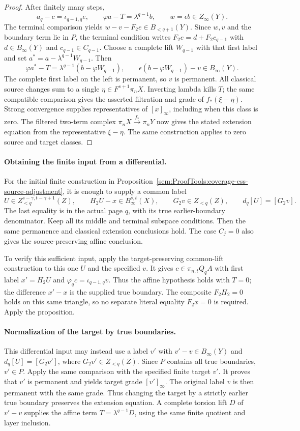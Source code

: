 \begin{proof}
After finitely many steps,
\[
 a_q-c=\iota_{q-1,q}e,\qquad
 \varphi a-T=\lambda^{q-1}b,
 \qquad w=\epsilon b\in Z_\infty(Y).
\]
The terminal comparison yields
$w-v-F_2e\in B_{<q+1}(Y)$. Since $w,v$ and the boundary term lie in $P$,
the terminal condition writes $F_2e=d+F_2c_{q-1}$ with
$d\in B_\infty(Y)$ and $c_{q-1}\in C_{q-1}$.
Choose a complete lift $W_{q-1}$ with that first label and set
$a^*=a-\lambda^{q-1}W_{q-1}$. Then
\[
 \varphi a^*-T=\lambda^{q-1}(b-\varphi W_{q-1}),\qquad
 \epsilon(b-\varphi W_{q-1})-v\in B_\infty(Y).
\]
The complete first label on the left is permanent, so $v$ is permanent.
All classical source changes sum to a single
$\eta\in F^{s+1}\pi_nX$. Inverting lambda kills $T$; the same compatible
comparison gives the asserted filtration and grade of $f_*(\xi-\eta)$.
Strong convergence supplies representatives of $[x]_\infty$, including
when this class is zero. The filtered two-term complex
$\pi_nX\xrightarrow{f_*}\pi_nY$ now gives the stated extension equation
from the representative $\xi-\eta$. The same construction applies to
zero source and target classes.
\end{proof}


\paragraph{Obtaining the finite input from a differential.}
For the initial finite construction in
Proposition~\ref{sem:ProofTools:coverage-ess-source-adjustment}, it is
enough to supply a common label
\[
 U\in Z_{<q}^{s-\gamma,t-\gamma+1}(Z),\qquad
 H_2U-x\in B_\infty^{s,t}(X),\qquad
 G_2v\in Z_{<q}(Z),\qquad d_q[U]=[G_2v].
\]
The last equality is in the actual page $q$, with its true earlier-boundary
denominator. Keep all its middle and terminal subspace conditions.
Then the same permanence and classical extension conclusions hold.
The case $C_j=0$ also gives the source-preserving affine conclusion.

To verify this sufficient input,
apply the target-preserving common-lift construction to this one $U$ and
the specified $v$. It gives
$c\in\pi_{n,t}Q_qA$ with first label $x'=H_2U$ and
$\varphi_qc=\iota_{q-1,q}v$. Thus the affine hypothesis holds with $T=0$;
the difference $x'-x$ is the supplied true boundary. The composite
$F_2H_2=0$ holds on this same triangle, so no separate literal equality
$F_2x=0$ is required. Apply the proposition.

\paragraph{Normalization of the target by true boundaries.}
This differential input may instead use a label $v'$ with
$v'-v\in B_\infty(Y)$ and $d_q[U]=[G_2v']$, where
$G_2v'\in Z_{<q}(Z)$. Since $P$ contains all true boundaries, $v'\in P$.
Apply the same comparison with the specified finite target $v'$.
It proves that $v'$ is permanent and yields target grade $[v']_\infty$.
The original label $v$ is then permanent with the same grade.
Thus changing the target by a strictly earlier true boundary
preserves the extension equation. A complete torsion
lift $D$ of $v'-v$ supplies the affine term
$T=\lambda^{q-1}D$, using the same finite quotient and layer inclusion.


